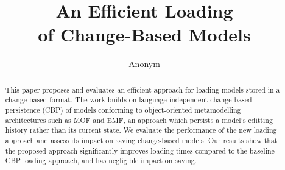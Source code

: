 \documentclass{llncs}
\begin{document}
    \renewcommand{\thelstlisting}{\arabic{lstlisting}}
    \renewcommand{\labelitemi}{$\bullet$}
    \newcommand{\dk}[1]{\textbf{[DK: #1]}}
    
    \title{An Efficient Loading \\ of Change-Based Models}
    \author{
        Anonym%
    }
    
    
    \maketitle              %
    \begin{abstract}
        This paper proposes and evaluates an efficient approach for loading models stored in a change-based format. The work builds on language-independent change-based persistence (CBP) of models conforming to object-oriented metamodelling architectures such as MOF and EMF, an approach which persists a model's editting history rather than its current state. We evaluate the performance of the new loading approach  and assess its impact on saving change-based models. Our results show that the proposed approach significantly improves loading times compared to the baseline CBP loading approach, and has negligible impact on saving.
        
        
    \end{abstract}
    
\end{document}

